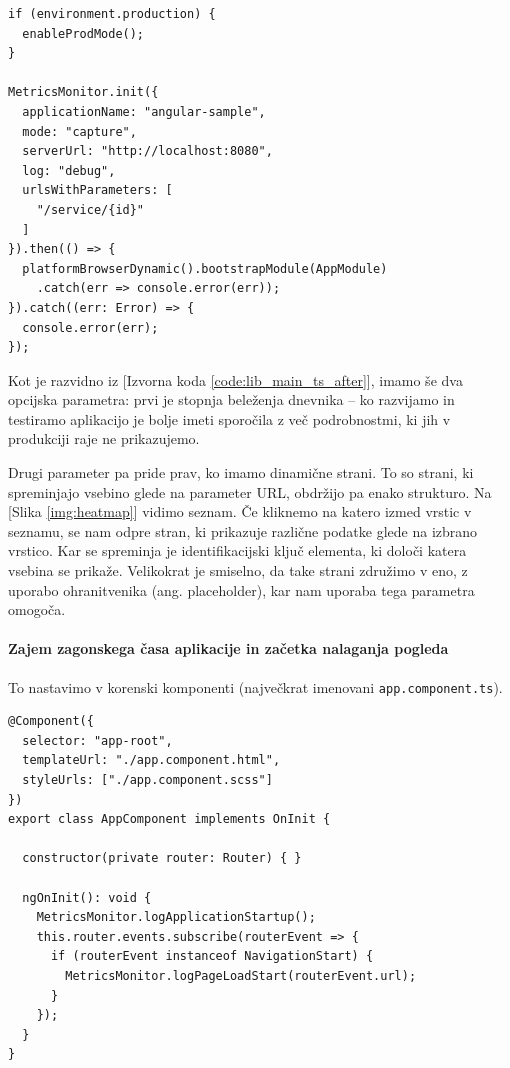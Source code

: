 \documentclass[a4paper, 12pt]{book}
\begin{document}
\begin{lstlisting}[label=code:lib_main_ts_after, caption=Inicializacija knjižnice]
if (environment.production) {
  enableProdMode();
}

MetricsMonitor.init({
  applicationName: "angular-sample",
  mode: "capture",
  serverUrl: "http://localhost:8080",
  log: "debug",
  urlsWithParameters: [
    "/service/{id}"
  ]
}).then(() => {
  platformBrowserDynamic().bootstrapModule(AppModule)
    .catch(err => console.error(err));
}).catch((err: Error) => {
  console.error(err);
});
\end{lstlisting}

Kot je razvidno iz [Izvorna koda \ref{code:lib_main_ts_after}], imamo še dva opcijska parametra: prvi je stopnja beleženja dnevnika -- ko razvijamo in testiramo aplikacijo je bolje imeti sporočila z več podrobnostmi, ki jih v produkciji raje ne prikazujemo.

Drugi parameter pa pride prav, ko imamo dinamične strani. To so strani, ki spreminjajo vsebino glede na parameter URL, obdržijo pa enako strukturo. Na [Slika \ref{img:heatmap}] vidimo seznam. Če kliknemo na katero izmed vrstic v seznamu, se nam odpre stran, ki prikazuje različne podatke glede na izbrano vrstico. Kar se spreminja je identifikacijski ključ elementa, ki določi katera vsebina se prikaže. Velikokrat je smiselno, da take strani združimo v eno, z uporabo ohranitvenika (ang. placeholder), kar nam uporaba tega parametra omogoča.

\paragraph{Zajem zagonskega časa aplikacije in začetka nalaganja pogleda}

To nastavimo v korenski komponenti (največkrat imenovani \verb|app.component.ts|).

\begin{lstlisting}[label=code:lib_app_comp, caption=Zajem zagonskega časa aplikacije in začetka nalaganja pogleda]
@Component({
  selector: "app-root",
  templateUrl: "./app.component.html",
  styleUrls: ["./app.component.scss"]
})
export class AppComponent implements OnInit {

  constructor(private router: Router) { }

  ngOnInit(): void {
    MetricsMonitor.logApplicationStartup();
    this.router.events.subscribe(routerEvent => {
      if (routerEvent instanceof NavigationStart) {
        MetricsMonitor.logPageLoadStart(routerEvent.url);
      }
    });
  }
}
\end{lstlisting}
\end{document}
